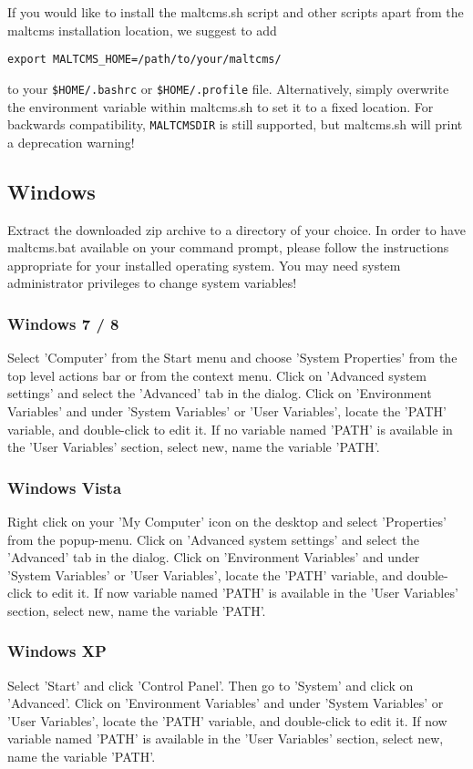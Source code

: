 If you would like to install the maltcms.sh script and other scripts 
apart from the maltcms installation location, we suggest to add 

\begin{lstlisting}[style=script]
export MALTCMS_HOME=/path/to/your/maltcms/
\end{lstlisting}

to your \verb|$HOME/.bashrc| or \verb|$HOME/.profile| file.
Alternatively, simply overwrite the environment variable within
maltcms.sh to set it to a fixed location. For backwards compatibility,
\verb|MALTCMSDIR| is still supported, but maltcms.sh will print a deprecation
warning!

\subsection{Windows}
Extract the downloaded zip archive to a directory of your choice. In order
to have maltcms.bat available on your command prompt, please follow the
instructions appropriate for your installed operating system. You may need
system administrator privileges to change system variables!

\subsubsection{Windows 7 / 8}
Select 'Computer' from the Start menu and choose 'System Properties' from
the top level actions bar or from the context menu. Click on 
'Advanced system settings' and select the 'Advanced' tab in the dialog.
Click on 'Environment Variables' and under 'System Variables' or 
'User Variables', locate the 'PATH' variable, and double-click to edit it.
If no variable named 'PATH' is available in the 'User Variables' section,
select new, name the variable 'PATH'.

\subsubsection{Windows Vista}
Right click on your 'My Computer' icon on the desktop and select 
'Properties' from the popup-menu. Click on 'Advanced system settings' and
select the 'Advanced' tab in the dialog. Click on 'Environment Variables'
and under 'System Variables' or 'User Variables', locate the 'PATH' 
variable, and double-click to edit it. If now variable named 'PATH' is
available in the 'User Variables' section, select new, name the variable
'PATH'.

\subsubsection{Windows XP}
Select 'Start' and click 'Control Panel'. Then go to 'System' and click on
'Advanced'. Click on 'Environment Variables' and under 'System Variables'
or 'User Variables', locate the 'PATH' variable, and double-click to edit
it. If now variable named 'PATH' is available in the 'User Variables'
section, select new, name the variable 'PATH'.

